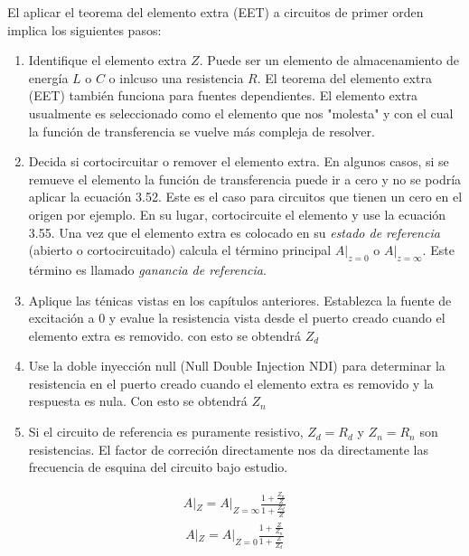 \documentclass[12pt,a4paper]{article}
\newcounter{ejemplo}
\begin{document}
	
	El aplicar el teorema del elemento extra (EET) a circuitos de primer orden implica los siguientes pasos:
	
	\begin{enumerate}
		\item Identifique el elemento extra $Z$. Puede ser un elemento de almacenamiento de energía $L$ o $C$ o inlcuso una resistencia $R$. El teorema del elemento extra (EET) también funciona para fuentes dependientes. El elemento extra usualmente es seleccionado como el elemento que nos "molesta" y con el cual la función de transferencia se vuelve más compleja de resolver.
		
		\item Decida si cortocircuitar o remover el elemento extra. En algunos casos, si se remueve el elemento la función de transferencia puede ir a cero y no se podría aplicar la ecuación 3.52. Este es el caso para circuitos que tienen un cero en el origen por ejemplo. En su lugar, cortocircuite el elemento y use la ecuación 3.55. Una vez que el elemento extra es colocado en su \textit{estado de referencia} (abierto o cortocircuitado) calcula el término principal $A|_{z=0}$ o $A|_{z=\infty}$. Este término es llamado \textit{ganancia de referencia}.
		
		\item Aplique las ténicas vistas en los capítulos anteriores. Establezca la fuente de excitación a 0 y evalue la resistencia vista desde el puerto creado cuando el elemento extra es removido. con esto se obtendrá $Z_d$
		
		\item Use la doble inyección null (Null Double Injection NDI) para determinar la resistencia en el puerto creado cuando el elemento extra es removido y la respuesta es nula. Con esto se obtendrá $Z_n$
		
		\item Si el circuito de referencia es puramente resistivo, $Z_d = R_d$ y $Z_n = R_n$ son resistencias. El factor de correción directamente nos da directamente las frecuencia de esquina del circuito bajo estudio.
		
	\end{enumerate}

	\begingroup
	\Large
	\begin{align}
		A|_Z = A|_{Z=\infty} \frac{1 + \frac{Z_n}{Z} }{1 + \frac{Z_d}{Z} }
	\end{align}
	\endgroup
	\begingroup
	\Large
	\begin{align}
		A|_Z = A|_{Z=0} \frac{1 + \frac{Z}{Z_n} }{1 + \frac{Z}{Z_d} }
	\end{align}
	\endgroup
	
	
\end{document}
